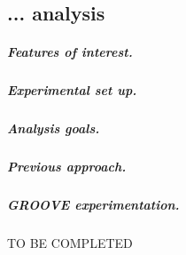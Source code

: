 
\subsection{... analysis}

\subparagraph*{Features of interest.}

\subparagraph*{Experimental set up.}

\subparagraph*{Analysis goals.}

\subparagraph*{Previous approach.}

\subparagraph*{GROOVE experimentation.}
TO BE COMPLETED
